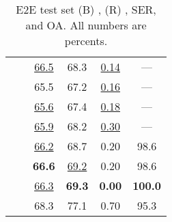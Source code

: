 \begin{table}[t!]
\begin{tabular}{ll cccc}
    \parbox[t]{2mm}{}
     &   & \uline{66.5} & 68.3 & \uline{0.14} & --- \\
     &   & 65.5 & 67.2 & \uline{0.16} & --- \\
     &   & \uline{65.6} & 67.4 & \uline{0.18} & --- \\
     &   & \uline{65.9} & 68.2 & \uline{0.30} & --- \\
     &   & \uline{66.2} & 68.7 & 0.20 & 98.6 \\
     &   & \textbf{66.6} & \uline{69.2} & 0.20 & 98.6 \\
     &   & \uline{66.3} & \textbf{69.3} & \textbf{0.00} & \textbf{100.0} \\
     &   & 68.3 & 77.1 & 0.70 & 95.3 \\
    \bottomrule
\end{tabular}



\caption{E2E test set (B) \bleu, (R) \rougel, SER, and OA. All numbers are percents. }
\label{tab:main.e2e.test}
\end{table}
